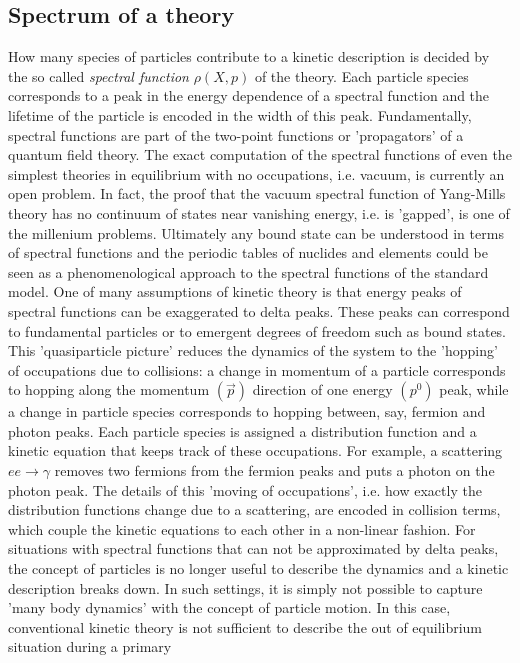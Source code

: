 \subsection{Spectrum of a theory}
How many species of particles contribute to a kinetic description is decided by the so called \emph{spectral function} $\rho(X, p)$ of the theory. Each particle species corresponds to a peak in the energy dependence
of a spectral function and the lifetime of the particle is encoded in the width of this peak. Fundamentally,
spectral functions are part of the two-point functions or ’propagators’ of a quantum field theory. The exact
computation of the spectral functions of even the simplest theories in equilibrium with no occupations, i.e.
vacuum, is currently an open problem. In fact, the proof that the vacuum spectral function of Yang-Mills
theory has no continuum of states near vanishing energy, i.e. is ’gapped’, is one of the millenium problems. Ultimately any bound state can be understood in terms of spectral functions and the periodic tables
of nuclides and elements could be seen as a phenomenological approach to the spectral functions of the
standard model. One of many assumptions of kinetic theory is that energy peaks of spectral functions
can be exaggerated to delta peaks. These peaks can correspond to fundamental particles or to emergent
degrees of freedom such as bound states. This ’quasiparticle picture’ reduces the dynamics of the system to
the ’hopping’ of occupations due to collisions: a change in momentum of a particle corresponds to hopping
along the momentum $(\vec{p})$ direction of one energy $(p^0 )$ peak, while a change in particle species corresponds
to hopping between, say, fermion and photon peaks. Each particle species is assigned a distribution
function and a kinetic equation that keeps track of these occupations. For example, a scattering $ee \rightarrow \gamma$
removes two fermions from the fermion peaks and puts a photon on the photon peak. The details of
this ’moving of occupations’, i.e. how exactly the distribution functions change due to a scattering, are
encoded in collision terms, which couple the kinetic equations to each other in a non-linear fashion. For
situations with spectral functions that can not be approximated by delta peaks, the concept of particles is
no longer useful to describe the dynamics and a kinetic description breaks down. In such settings, it is simply not possible to capture ’many body dynamics’ with the concept of particle motion. In this case,
conventional kinetic theory is not sufficient to describe the out of equilibrium situation during a primary
